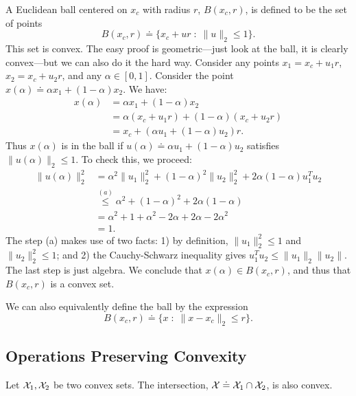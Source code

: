 \documentclass[12pt]{article}
\begin{document}
A Euclidean ball centered on $x_c$ with radius $r$, $B(x_c, r)$, is defined to be the set of points
%
\begin{equation*}
B(x_c, r) \doteq \{x_c + ur \; : \; \|u\|_2 \leq 1\}.
\end{equation*}
%
This set is convex. The easy proof is geometric---just look at the ball, it is clearly convex---but we can also do it the hard way. Consider any points $x_1 = x_c + u_1 r$, $x_2 = x_c + u_2 r$, and any $\alpha \in [0,1]$. Consider the point $x(\alpha) \doteq \alpha x_1 + (1-\alpha) x_2$. We have:
%
\begin{align*}
x(\alpha) &= \alpha x_1 + (1-\alpha) x_2\\
 &= \alpha (x_c + u_1 r) + (1-\alpha) (x_c + u_2 r) \\
&= x_c + \left( \alpha u_1 + (1-\alpha) u_2 \right) r. 
\end{align*}
%
Thus $x(\alpha)$ is in the ball if $u(\alpha) \doteq \alpha u_1 + (1-\alpha) u_2$ satisfies $\|u(\alpha)\|_2 \leq 1$. To check this, we proceed:
%
\begin{align*}
\|u(\alpha)\|_2^2 &= \alpha^2 \|u_1\|_2^2 + (1-\alpha)^2 \|u_2\|_2^2 + 2\alpha(1-\alpha) u_1^T u_2 \\
&\overset{(a)}{\leq} \alpha^2 + (1-\alpha)^2 + 2\alpha(1-\alpha) \\
&= \alpha^2 + 1 + \alpha^2 - 2\alpha + 2\alpha - 2\alpha^2 \\
&= 1.
\end{align*}
%
The step (a) makes use of two facts: 1) by definition, $\|u_1\|_2^2 \leq 1$ and $\|u_2\|_2^2 \leq 1$; and 2) the Cauchy-Schwarz inequality gives $u_1^T u_2 \leq \|u_1\|_2 \|u_2\|$. The last step is just algebra. We conclude that $x(\alpha) \in B(x_c, r)$, and thus that $B(x_c, r)$ is a convex set.

\begin{remark}
We can also equivalently define the ball by the expression
%
\begin{equation*}
B(x_c, r) \doteq \{x \; : \; \|x - x_c \|_2 \leq r\}. 
\end{equation*}
\end{remark}


\subsection{Operations Preserving Convexity}

\begin{proposition}Let ${\mathcal X}_1, {\mathcal X}_2$ be two convex sets. The intersection, ${\mathcal X} \doteq {\mathcal X}_1 \cap {\mathcal X}_2$, is also convex. \end{proposition}
\end{document}
